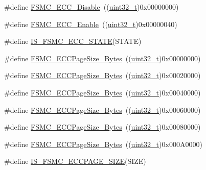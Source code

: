 \begin{DoxyCompactItemize}
\item 
\#define \hyperlink{group___f_s_m_c___e_c_c_ga9a3264c0718f5023fd106abea7ef806d}{F\+S\+M\+C\+\_\+\+E\+C\+C\+\_\+\+Disable}~((\hyperlink{_p_e___types_8h_a33594304e786b158f3fb30289278f5af}{uint32\+\_\+t})0x00000000)
\item 
\#define \hyperlink{group___f_s_m_c___e_c_c_ga9d940243830695412d4c98228bb5b763}{F\+S\+M\+C\+\_\+\+E\+C\+C\+\_\+\+Enable}~((\hyperlink{_p_e___types_8h_a33594304e786b158f3fb30289278f5af}{uint32\+\_\+t})0x00000040)
\item 
\#define \hyperlink{group___f_s_m_c___e_c_c_gaf1a7cb45edd8707bf4ea8aac96799c77}{I\+S\+\_\+\+F\+S\+M\+C\+\_\+\+E\+C\+C\+\_\+\+S\+T\+A\+TE}(S\+T\+A\+TE)
\item 
\#define \hyperlink{group___f_s_m_c___e_c_c___page___size_gaaa1661267b44e6728fa64aca79de54b3}{F\+S\+M\+C\+\_\+\+E\+C\+C\+Page\+Size\+\_\+Bytes}~((\hyperlink{_p_e___types_8h_a33594304e786b158f3fb30289278f5af}{uint32\+\_\+t})0x00000000)
\item 
\#define \hyperlink{group___f_s_m_c___e_c_c___page___size_gacb4da17c28dde89e38ff4ed40497f6b5}{F\+S\+M\+C\+\_\+\+E\+C\+C\+Page\+Size\+\_\+Bytes}~((\hyperlink{_p_e___types_8h_a33594304e786b158f3fb30289278f5af}{uint32\+\_\+t})0x00020000)
\item 
\#define \hyperlink{group___f_s_m_c___e_c_c___page___size_ga8137931c96b63ec7e6f80a8c7391433f}{F\+S\+M\+C\+\_\+\+E\+C\+C\+Page\+Size\+\_\+Bytes}~((\hyperlink{_p_e___types_8h_a33594304e786b158f3fb30289278f5af}{uint32\+\_\+t})0x00040000)
\item 
\#define \hyperlink{group___f_s_m_c___e_c_c___page___size_gab8f3ae95becd59e71a976b97ded904b8}{F\+S\+M\+C\+\_\+\+E\+C\+C\+Page\+Size\+\_\+Bytes}~((\hyperlink{_p_e___types_8h_a33594304e786b158f3fb30289278f5af}{uint32\+\_\+t})0x00060000)
\item 
\#define \hyperlink{group___f_s_m_c___e_c_c___page___size_gaec2e9e434685a1756bd171699248f65a}{F\+S\+M\+C\+\_\+\+E\+C\+C\+Page\+Size\+\_\+Bytes}~((\hyperlink{_p_e___types_8h_a33594304e786b158f3fb30289278f5af}{uint32\+\_\+t})0x00080000)
\item 
\#define \hyperlink{group___f_s_m_c___e_c_c___page___size_gab6877a99ddf02e7aa95cf04896ce731d}{F\+S\+M\+C\+\_\+\+E\+C\+C\+Page\+Size\+\_\+Bytes}~((\hyperlink{_p_e___types_8h_a33594304e786b158f3fb30289278f5af}{uint32\+\_\+t})0x000\+A0000)
\item 
\#define \hyperlink{group___f_s_m_c___e_c_c___page___size_ga58fefa0d55875775a88f54ad7498178f}{I\+S\+\_\+\+F\+S\+M\+C\+\_\+\+E\+C\+C\+P\+A\+G\+E\+\_\+\+S\+I\+ZE}(S\+I\+ZE)

\end{DoxyCompactItemize}

